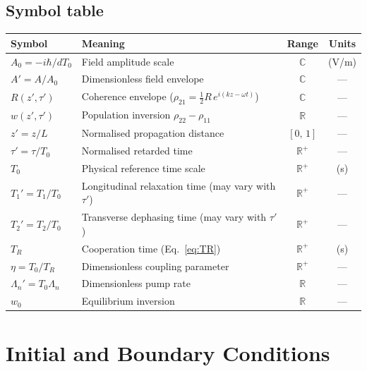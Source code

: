 \documentclass[12pt,a4paper]{article}
\newcommand{\T}{T_0}
\begin{document}
\subsection{Symbol table}
\begin{center}
\begin{tabular}{@{}llcc@{}}
  \toprule
  Symbol & Meaning & Range & Units \\
  \midrule
  $A_0 = -i\hbar/d\T$        & Field amplitude scale                            & $\mathbb{C}$   & (V/m) \\
  $A' = A/A_0$               & Dimensionless field envelope                     & $\mathbb{C}$   & ---   \\
  $R(z',\tau')$ & Coherence envelope ($\rho_{21} = \tfrac{1}{2}R\,e^{i(kz-\omega t)}$) & $\mathbb{C}$ & --- \\
  $w(z',\tau')$              & Population inversion $\rho_{22}-\rho_{11}$       & $\mathbb{R}$   & ---   \\
  $z' = z/L$                 & Normalised propagation distance                  & $[0,\,1]$      & ---   \\
  $\tau' = \tau/\T$          & Normalised retarded time                         & $\mathbb{R}^+$ & ---   \\
  $\T$                       & Physical reference time scale                    & $\mathbb{R}^+$ & (s)   \\
  $T_1' = T_1/\T$ & Longitudinal relaxation time (may vary with $\tau'$) & $\mathbb{R}^+$ & --- \\
  $T_2' = T_2/\T$ & Transverse dephasing time (may vary with $\tau'$)    & $\mathbb{R}^+$ & --- \\
  $T_R$                      & Cooperation time (Eq.~\ref{eq:TR})               & $\mathbb{R}^+$ & (s)   \\
  $\eta = \T/T_R$            & Dimensionless coupling parameter                 & $\mathbb{R}^+$ & ---   \\
  $\Lambda_n' = \T\Lambda_n$ & Dimensionless pump rate                          & $\mathbb{R}$   & ---   \\
  $w_0$                      & Equilibrium inversion                            & $\mathbb{R}$   & ---   \\
  \bottomrule
\end{tabular}
\end{center}
\section{Initial and Boundary Conditions}
\end{document}
